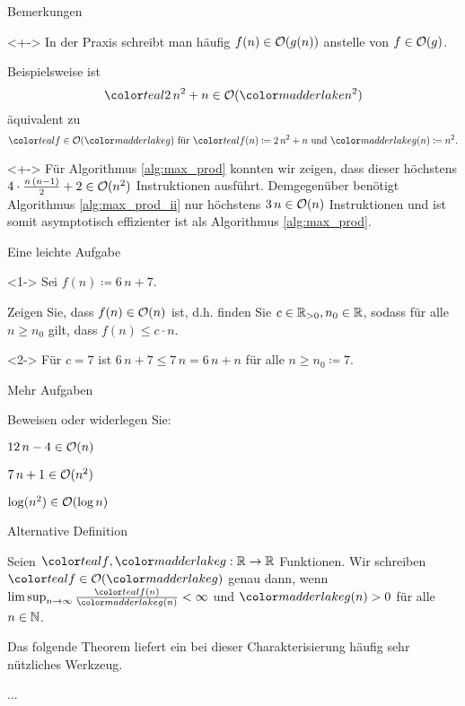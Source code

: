 \begin{frame}{Bemerkungen}
\begin{remark}<+->
In der Praxis schreibt man h\"aufig $f(n) \in \mathcal{O}(g(n))$ anstelle von $f \in \mathcal{O}(g)$.

Beispielsweise ist $$\teal{2 \, n^2 + n} \in \bigO(\red{n^2})$$ \"aquivalent zu $$\teal{f} \in \bigO(\red{g}) \text{ f\"ur } \teal{f(n) \coloneqq 2 \, n^2 + n} \text{ und } \red{g(n) \coloneqq n^2}.$$
\end{remark}

\begin{remark}<+->
F\"ur Algorithmus \ref{alg:max_prod} konnten wir zeigen, dass dieser h\"ochstens $4 \cdot \frac{n \, (n-1)}{2} + 2 \in \mathcal{O}(n^2)$ Instruktionen ausf\"uhrt.
Demgegen\"uber ben\"otigt Algorithmus \ref{alg:max_prod_ii} nur h\"ochstens $3 \, n \in \mathcal{O}(n)$ Instruktionen und ist somit \alert{asymptotisch} effizienter ist als Algorithmus \ref{alg:max_prod}.
\end{remark}
\end{frame}

\begin{frame}{Eine leichte Aufgabe}
\begin{task}<1->
Sei $f(n) \coloneqq 6 \, n + 7$.

Zeigen Sie, dass $f(n) \in \mathcal{O}(n)$ ist, d.h. finden Sie $c \in \mathbb{R}_{> 0}, n_0 \in \mathbb{R}$, sodass f\"ur alle $n \geq n_0$ gilt, dass $f(n) \leq c \cdot n$.
\end{task}

\begin{solution}<2->
F\"ur $c = 7$ ist $6 \, n + 7 \leq 7 \, n = 6 \, n + n$ f\"ur alle $n \geq n_0 \coloneqq 7$.
\end{solution}
\end{frame}

\begin{frame}{Mehr Aufgaben}
\begin{task}
Beweisen oder widerlegen Sie:
\begin{subtasks}
    \item $12 \, n - 4 \in \mathcal{O}(n)$
    \item $7 \, n + 1 \in \mathcal{O}(n^2)$
    \item $\log(n^2) \in \mathcal{O}(\log n)$
\end{subtasks}
\end{task}
\end{frame}

\begin{frame}{Alternative Definition}
\begin{definition}
Seien $\teal{f}, \red{g}: \real \to \real$ Funktionen.
Wir schreiben $\teal{f} \in \bigO(\red{g})$ genau dann, wenn $\limsup_{n \to \infty} \frac{\teal{f(n)}}{\red{g(n)}} < \infty$ und $\red{g(n)} > 0$ f\"ur alle $n \in \mathbb{N}$.
\end{definition}

Das folgende Theorem liefert ein bei dieser Charakterisierung h\"aufig sehr n\"utzliches Werkzeug.

\begin{theorem}
...
\end{theorem}
\end{frame}

